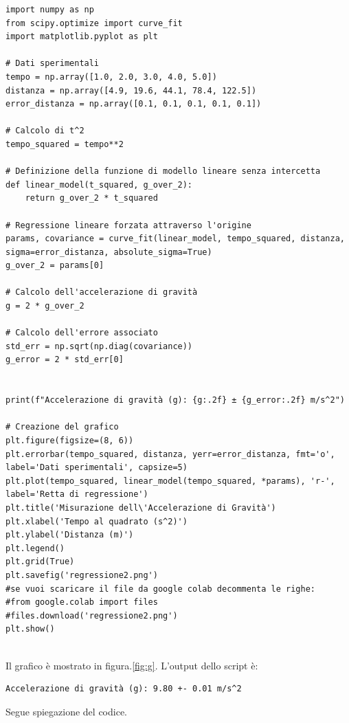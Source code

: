 \documentclass[a4paper,12pt]{article}
\begin{document}
\begin{lstlisting}[caption={Calcolo della Regressione Lineare e Accelerazione di Gravità}]
import numpy as np
from scipy.optimize import curve_fit
import matplotlib.pyplot as plt

# Dati sperimentali
tempo = np.array([1.0, 2.0, 3.0, 4.0, 5.0])
distanza = np.array([4.9, 19.6, 44.1, 78.4, 122.5])
error_distanza = np.array([0.1, 0.1, 0.1, 0.1, 0.1])

# Calcolo di t^2
tempo_squared = tempo**2

# Definizione della funzione di modello lineare senza intercetta
def linear_model(t_squared, g_over_2):
    return g_over_2 * t_squared

# Regressione lineare forzata attraverso l'origine
params, covariance = curve_fit(linear_model, tempo_squared, distanza, sigma=error_distanza, absolute_sigma=True)
g_over_2 = params[0]

# Calcolo dell'accelerazione di gravità
g = 2 * g_over_2

# Calcolo dell'errore associato
std_err = np.sqrt(np.diag(covariance))
g_error = 2 * std_err[0]


print(f"Accelerazione di gravità (g): {g:.2f} ± {g_error:.2f} m/s^2")

# Creazione del grafico
plt.figure(figsize=(8, 6))
plt.errorbar(tempo_squared, distanza, yerr=error_distanza, fmt='o', label='Dati sperimentali', capsize=5)
plt.plot(tempo_squared, linear_model(tempo_squared, *params), 'r-', label='Retta di regressione')
plt.title('Misurazione dell\'Accelerazione di Gravità')
plt.xlabel('Tempo al quadrato (s^2)')
plt.ylabel('Distanza (m)')
plt.legend()
plt.grid(True)
plt.savefig('regressione2.png')
#se vuoi scaricare il file da google colab decommenta le righe:
#from google.colab import files
#files.download('regressione2.png')
plt.show()


\end{lstlisting}


Il grafico è mostrato in figura.\ref{fig:g}. L'output dello script è:
\begin{verbatim}
Accelerazione di gravità (g): 9.80 +- 0.01 m/s^2
\end{verbatim}

Segue spiegazione del codice.
\end{document}
